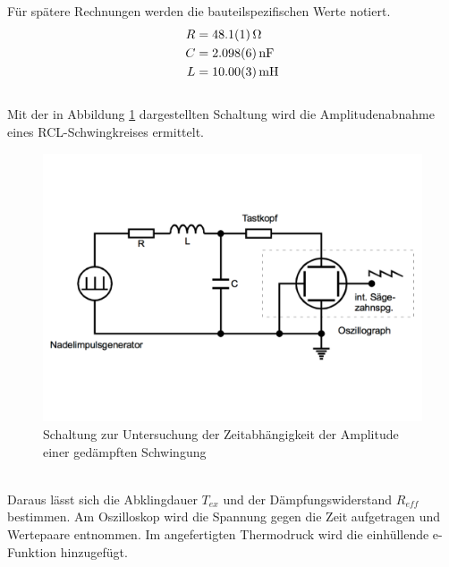 Für spätere Rechnungen werden die bauteilspezifischen Werte notiert.
\begin{align*}
  R &= \SI{48,1\pm0,1}{\Omega}\\
  C &= \SI{2,098\pm0,006}{nF}\\
  L &= \SI{10,00\pm0,03}{mH}
\end{align*}
\\Mit der in Abbildung \ref{aufbau1} dargestellten Schaltung wird die Amplitudenabnahme eines RCL-Schwingkreises ermittelt.
 \begin{figure}[h!]
   \centering
   \includegraphics[width=\textwidth]{aufbau1.pdf}
   \caption{Schaltung zur Untersuchung der Zeitabhängigkeit der Amplitude einer gedämpften Schwingung \cite{1}}
   \label{aufbau1}
 \end{figure}
 \\Daraus lässt sich die Abklingdauer $T_{ex}$ und der Dämpfungswiderstand $R_{eff}$ bestimmen.
Am Oszilloskop wird die Spannung gegen die Zeit aufgetragen und Wertepaare entnommen.
Im angefertigten Thermodruck wird die einhüllende e-Funktion hinzugefügt.\\

